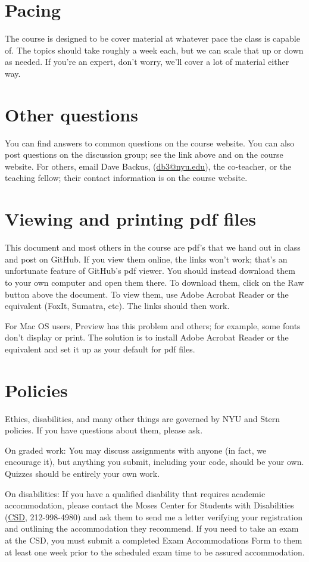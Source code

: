 \documentclass[11pt]{article}
\begin{document}
\section*{Pacing} 


The course is designed to be cover material at whatever pace the class is capable of. 
The topics should take roughly a week each, but we can scale that up or down as needed.  
If you're an expert, don't worry, we'll cover a lot of material either way.  


\section*{Other questions}

You can find answers to common questions on the course website.
You can also post questions on the discussion group;
see the link above and on the course website.
For others, email Dave Backus, (\href{mailto:db3@nyu.edu}{db3@nyu.edu}),
the co-teacher, or the teaching fellow; their contact information is on the course website.


\section*{Viewing and printing pdf files}

This document and most others in the course are pdf's that we hand out in class and post on GitHub.
If you view them online, the links won't work; that's an unfortunate feature of GitHub's pdf viewer.
You should instead download them to your own computer and open them there.
To download them,
click on the Raw button above the document.
To view them, use Adobe Acrobat Reader or the equivalent (FoxIt, Sumatra, etc).
The links should then work.

For Mac OS users, Preview has this problem and others; for example,
some fonts don't display or print.
The solution is to install Adobe Acrobat Reader or the equivalent
and set it up as your default for pdf files.


\section*{Policies}

Ethics, disabilities, and many other things are governed by NYU
and Stern policies.
If you have questions about them, please ask.

On graded work:
You may discuss assignments with anyone (in fact, we encourage it),
but anything you submit, including your code, should be your own.
Quizzes should be entirely your own work.

On disabilities:
If you have a qualified disability that requires academic accommodation,
please contact the Moses Center for Students with Disabilities
(\href{http://www.nyu.edu/life/safety-health-wellness/students-with-disabilities.html}{CSD},
212-998-4980) and ask them to
send me a letter verifying your registration and outlining the accommodation they recommend.
If you need to take an exam at the CSD,
you must submit a completed Exam Accommodations Form to them
at least one week prior to the scheduled exam time to be assured accommodation.



\end{document}
